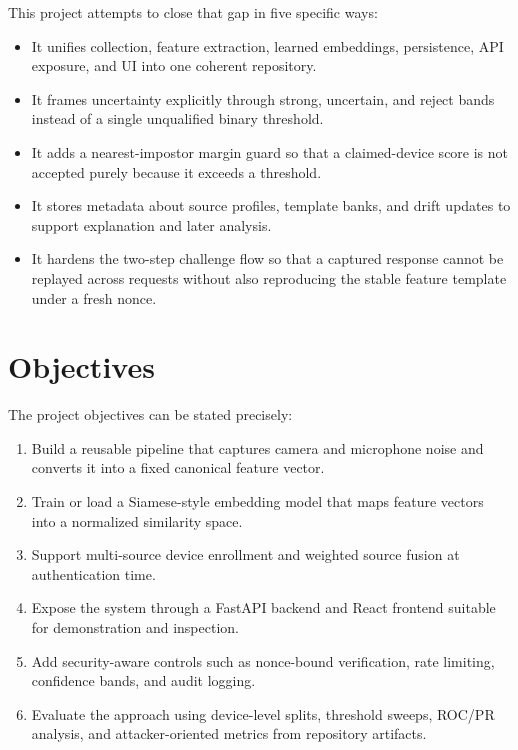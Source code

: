 \documentclass[12pt]{report}
\begin{document}
This project attempts to close that gap in five specific ways:
\begin{itemize}[leftmargin=1.2cm]
\item It unifies collection, feature extraction, learned embeddings, persistence, API exposure, and UI into one coherent repository.
\item It frames uncertainty explicitly through strong, uncertain, and reject bands instead of a single unqualified binary threshold.
\item It adds a nearest-impostor margin guard so that a claimed-device score is not accepted purely because it exceeds a threshold.
\item It stores metadata about source profiles, template banks, and drift updates to support explanation and later analysis.
\item It hardens the two-step challenge flow so that a captured response cannot be replayed across requests without also reproducing the stable feature template under a fresh nonce.
\end{itemize}

\section{Objectives}
The project objectives can be stated precisely:
\begin{enumerate}[leftmargin=1.2cm]
\item Build a reusable pipeline that captures camera and microphone noise and converts it into a fixed canonical feature vector.
\item Train or load a Siamese-style embedding model that maps feature vectors into a normalized similarity space.
\item Support multi-source device enrollment and weighted source fusion at authentication time.
\item Expose the system through a FastAPI backend and React frontend suitable for demonstration and inspection.
\item Add security-aware controls such as nonce-bound verification, rate limiting, confidence bands, and audit logging.
\item Evaluate the approach using device-level splits, threshold sweeps, ROC/PR analysis, and attacker-oriented metrics from repository artifacts.
\end{enumerate}
\end{document}
